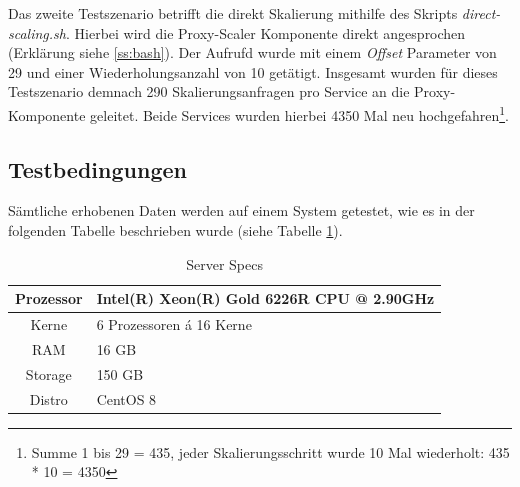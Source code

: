 Das zweite Testszenario betrifft die direkt Skalierung mithilfe des Skripts \emph{direct-scaling.sh}. Hierbei wird die Proxy-Scaler Komponente direkt angesprochen (Erklärung siehe \ref{ss:bash}). Der Aufrufd wurde mit einem \emph{Offset} Parameter von 29 und einer Wiederholungsanzahl von 10 getätigt. Insgesamt wurden für dieses Testszenario demnach 290 Skalierungsanfragen pro Service an die Proxy-Komponente geleitet. Beide Services wurden hierbei 4350 Mal neu hochgefahren\footnote{Summe 1 bis 29 = 435, jeder Skalierungsschritt wurde 10 Mal wiederholt: 435 * 10 = 4350}.

\subsection{Testbedingungen \checkmark}

Sämtliche erhobenen Daten werden auf einem System getestet, wie es in der folgenden Tabelle beschrieben wurde (siehe Tabelle \ref{tab:serverSpecs}). 

\renewcommand\theadalign{bc}
\renewcommand\theadfont{\bfseries}
\renewcommand\theadgape{\Gape[4pt]}
\renewcommand\cellgape{\Gape[4pt]}

\begin{table}[ht!]
  \centering
  \caption{Server Specs}
  \label{tab:serverSpecs}
  \bigskip
  \begin{tabular}{ c l }
    \toprule
    Prozessor & Intel(R) Xeon(R) Gold 6226R CPU @ 2.90GHz \\
    \midrule
    Kerne & 6 Prozessoren á 16 Kerne \\
    \midrule
    RAM & 16 GB \\
    \midrule
    Storage & 150 GB \\
    \midrule
    Distro & CentOS 8\\
    \bottomrule
  \end{tabular}
\end{table}
